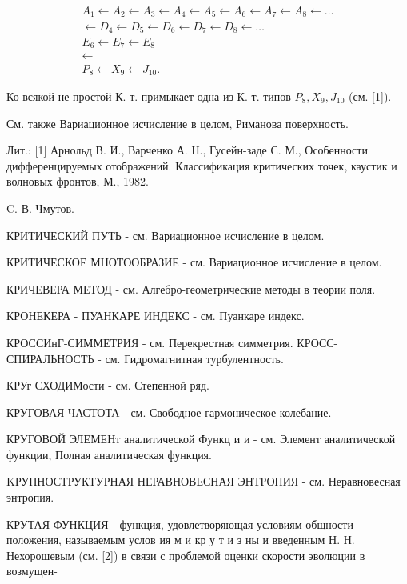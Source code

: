 \documentclass[10pt]{article}
\begin{document}
\[

\begin{gathered}

A_{1} \leftarrow A_{2} \leftarrow A_{3} \leftarrow A_{4} \leftarrow A_{5} \leftarrow A_{6} \leftarrow A_{7} \leftarrow A_{8} \leftarrow \ldots \\

\leftarrow D_{4} \leftarrow D_{5} \leftarrow D_{6} \leftarrow D_{7} \leftarrow D_{8} \leftarrow \ldots \\

E_{6} \leftarrow E_{7} \leftarrow E_{8} \\

\leftarrow \\

P_{8} \leftarrow X_{9} \leftarrow J_{10} .

\end{gathered}

\]



Ко всякой не простой К. т. примыкает одна из К. т. типов $P_{8}, X_{9}, J_{10}$ (см. [1]).



См. также Вариационное исчисление в целом, Риманова поверхность.



Лит.: [1] Арнольд В. И., Варченко А. Н., Гусейн-заде С. М., Особенности дифференцируемых отображений. Классификация критических точек, каустик и волновых фронтов, М., 1982.



C. В. Чмутов.



КРИТИЧЕСКИЙ ПУТЬ - см. Вариационное исчисление в целом.



КРИТИЧЕСКОЕ МНОТООБРАЗИЕ - см. Вариационное исчисление в целом.



КРИЧЕВЕРА МЕТОД - см. Алгебро-геометрические методы в теории поля.



КРОНЕКЕРА - ПУАНКАРЕ ИНДЕКС - см. Пуанкаре индекс.



КРОССИнГ-СИММЕТРИЯ - см. Перекрестная симметрия. КРОСС-СПИРАЛЬНОСТЬ - см. Гидромагнитная турбулентность.



КРУг СХОДИМости - см. Степенной ряд.



КРУГОВАЯ ЧАСТОТА - см. Свободное гармоническое колебание.



КРУГОВОЙ ЭЛЕМЕНт аналитической Функц и и - см. Элемент аналитической функции, Полная аналитическая функция.



KРУПНОСТРУКТУРНАЯ НЕРАВНОВЕСНАЯ ЭНТРОПИЯ - см. Неравновесная энтропия.



КРУТАЯ ФУНКЦИЯ - функция, удовлетворяющая условиям общности положения, называемым услов ия м и кр у т и з ны и введенным Н. Н. Нехорошевым (см. [2]) в связи с проблемой оценки скорости эволюции в возмущен-
\end{document}
